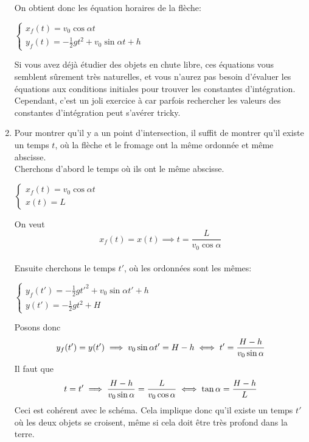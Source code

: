 \documentclass[a4paper,10pt,twoside]{article}
\begin{document}
\begin{enumerate}
    On obtient donc les équation horaires de la flèche:
    \begin{center}
        $\begin{cases}
        x_f(t) = v_0 \cos{\alpha} t\\
        y_f(t) = -\frac{1}{2}gt^2 + v_0 \sin{\alpha}t + h
    \end{cases}$
    \end{center}
       Si vous avez déjà étudier des objets en chute libre, ces équations vous semblent sûrement très naturelles, et vous n'aurez pas besoin d'évaluer les équations aux conditions initiales pour trouver les constantes d'intégration. Cependant, c'est un joli exercice à car parfois rechercher les valeurs des constantes d'intégration peut s'avérer tricky. 
    \item Pour montrer qu'il y a un point d'intersection, il suffit de montrer qu'il existe un temps $t$, où la flèche et le fromage ont la même ordonnée et même abscisse. \\Cherchons d'abord le temps où ils ont le même abscisse. 
    \begin{center}
        $\begin{cases}
        x_f(t)=v_0 \cos{\alpha}t \\
        x(t)=L
        \end{cases}$
        
    \end{center}
    On veut \[x_f(t)= x(t) \implies t=\dfrac {L}{v_0\cos{\alpha}}\] \\
    Ensuite cherchons le temps $t'$, où les ordonnées sont les mêmes:
    \begin{center}
        $\begin{cases}
             y_f(t')= -\frac{1}{2}gt'^2 + v_0 \sin{\alpha}t' + h \\
             y(t')=-\frac{1}{2}gt^2 + H
        \end{cases}$        
    \end{center}
    Posons donc \[y_f(t')=y(t') \implies v_0 \sin{\alpha}t'=H-h \\
    \iff t'=\dfrac {H-h}{v_0 \sin{\alpha}} \]
    Il faut que \[t=t'\implies \dfrac {H-h}{v_0 \sin{\alpha}}=\dfrac {L}{v_0\cos{\alpha}} \\
    \iff \tan{\alpha}=\dfrac{H-h}{L} \]
    Ceci est cohérent avec le schéma. Cela implique donc qu'il existe un temps $t'$ où les deux objets se croisent, même si cela doit être très profond dans la terre. 
    

\end{enumerate}
\end{document}
